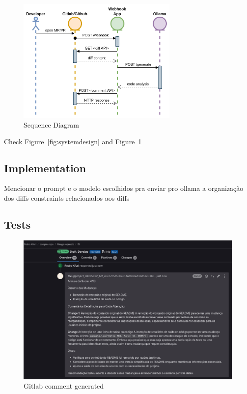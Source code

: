 \documentclass[12pt]{article}
\begin{document}
\begin{figure}[htbp]
    \centering
    \includegraphics[width=0.7\textwidth]{sequence.png}
    \caption{Sequence Diagram}
    \label{fig:sequence}
\end{figure}

Check Figure~\ref{fig:systemdesign} and Figure~\ref{fig:sequence}  

\subsection{Implementation}
Mencionar o prompt e o modelo escolhidos pra enviar pro ollama
a organização dos diffs
constraints relacionados aos diffs

\subsection{Tests}
\begin{figure}[htbp]
    \centering
    \includegraphics[width=1\textwidth]{gitlab.png}
    \caption{Gitlab comment generated}
    \label{fig:gitlab}
\end{figure}
\end{document}
